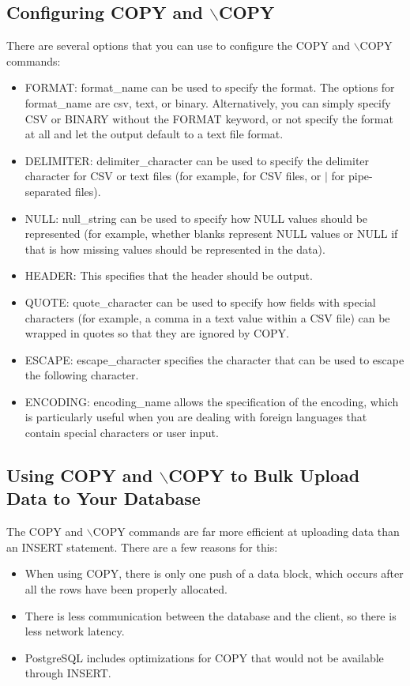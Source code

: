 \subsection{Configuring COPY and $\backslash$COPY}
There are several options that you can use to configure the COPY and
$\backslash$COPY commands:
\begin{itemize}
    \item FORMAT: format\_name can be used to specify the format. The options for format\_name are csv, text, or binary. Alternatively, you can simply specify CSV or BINARY without the FORMAT keyword, or not specify the format at all and let the output default to a text file format.
    \item DELIMITER: delimiter\_character can be used to specify the delimiter character for CSV or text files (for example, for CSV files, or $|$ for pipe-separated files).
    \item  NULL: null\_string can be used to specify how NULL values should be represented (for example, whether blanks represent NULL values or NULL if that is how missing values should be represented in the data).
    \item  HEADER: This specifies that the header should be output.
    \item  QUOTE: quote\_character can be used to specify how fields with special characters (for example, a comma in a text value within a CSV file) can be wrapped in quotes so that they are ignored by COPY.
    \item  ESCAPE: escape\_character specifies the character that can be used to escape the following character.
    \item  ENCODING: encoding\_name allows the specification of the encoding, which is particularly useful when you are dealing with foreign languages that contain special characters or user input.
\end{itemize}
\subsection{Using COPY and $\backslash$COPY to Bulk Upload Data to Your Database}
The COPY and $\backslash$COPY commands are far more efficient at uploading data than an INSERT statement. There are a few reasons for this:
\begin{itemize}
    \item  When using COPY, there is only one push of a data block, which occurs after all the rows have been properly allocated.
    \item  There is less communication between the database and the client, so there is less network latency.
    \item  PostgreSQL includes optimizations for COPY that would not be available through INSERT.
\end{itemize}

